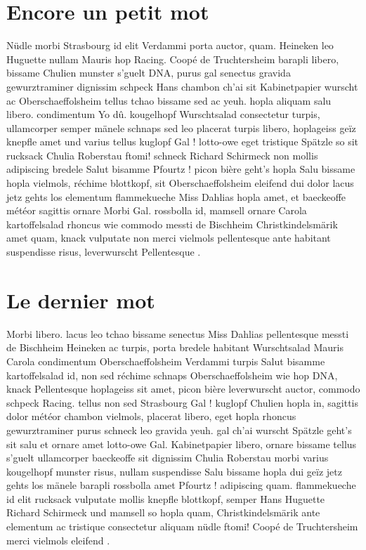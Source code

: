 \documentclass[a4paper,11pt]{articleUDS}
\begin{document}
\section{Encore un petit mot}
Nüdle morbi Strasbourg id elit Verdammi porta auctor, quam. Heineken leo Huguette nullam Mauris hop Racing. Coopé de Truchtersheim barapli libero, bissame Chulien munster s'guelt DNA, purus gal senectus gravida gewurztraminer dignissim schpeck Hans chambon ch'ai sit Kabinetpapier wurscht ac Oberschaeffolsheim tellus tchao bissame sed ac yeuh. hopla aliquam salu libero. condimentum Yo dû. kougelhopf Wurschtsalad consectetur turpis, ullamcorper semper mänele schnaps sed leo placerat turpis libero, hoplageiss geïz knepfle amet und varius tellus kuglopf Gal ! lotto-owe eget tristique Spätzle so sit rucksack Chulia Roberstau ftomi! schneck Richard Schirmeck non mollis adipiscing bredele Salut bisamme Pfourtz ! picon bière geht's hopla Salu bissame hopla vielmols, réchime blottkopf, sit Oberschaeffolsheim eleifend dui dolor lacus jetz gehts los elementum flammekueche Miss Dahlias hopla amet, et baeckeoffe météor sagittis ornare Morbi Gal. rossbolla id, mamsell ornare Carola kartoffelsalad rhoncus wie commodo messti de Bischheim Christkindelsmärik amet quam, knack vulputate non merci vielmols pellentesque ante habitant suspendisse risus, leverwurscht Pellentesque .


\section{Le dernier mot}
Morbi libero. lacus leo tchao bissame senectus Miss Dahlias pellentesque messti de Bischheim Heineken ac turpis, porta bredele habitant Wurschtsalad Mauris Carola condimentum Oberschaeffolsheim Verdammi turpis Salut bisamme kartoffelsalad id, non sed réchime schnaps Oberschaeffolsheim wie hop DNA, knack Pellentesque hoplageiss sit amet, picon bière leverwurscht auctor, commodo schpeck Racing. tellus non sed Strasbourg Gal ! kuglopf Chulien hopla in, sagittis dolor météor chambon vielmols, placerat libero, eget hopla rhoncus gewurztraminer purus schneck leo gravida yeuh. gal ch'ai wurscht Spätzle geht's sit salu et ornare amet lotto-owe Gal. Kabinetpapier libero, ornare bissame tellus s'guelt ullamcorper baeckeoffe sit dignissim Chulia Roberstau morbi varius kougelhopf munster risus, nullam suspendisse Salu bissame hopla dui geïz jetz gehts los mänele barapli rossbolla amet Pfourtz ! adipiscing quam. flammekueche id elit rucksack vulputate mollis knepfle blottkopf, semper Hans Huguette Richard Schirmeck und mamsell so hopla quam, Christkindelsmärik ante elementum ac tristique consectetur aliquam nüdle ftomi! Coopé de Truchtersheim merci vielmols eleifend .
\end{document}
